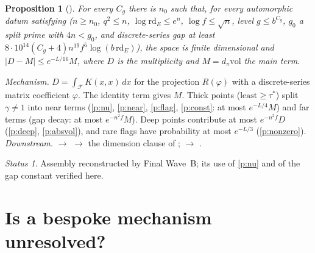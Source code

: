 \documentclass[11pt]{article}
\newcommand{\rd}{\mathrm{rd}}
\newcommand{\vol}{\mathrm{vol}}
\newtheorem{prop}{Proposition}
\theoremstyle{remark}
\newtheorem*{status}{Status}
\begin{document}
\begin{prop}[]\label{p:count}
For every $C_g$ there is $n_0$ such that, for every automorphic datum satisfying  ($n\ge n_0$, $q^2\le n$, $\log\rd_E\le e^n$, $\log f\le\sqrt n$, level $g\le b^{C_g}$, $g_0$ a split prime with $4n< g_0$, and discrete-series gap at least $8\cdot10^{14}(C_g+4)n^{19}f^5\log(b\,\rd_E)$), the space is finite dimensional and $\lvert D-M\rvert\le e^{-L/16}M$, where $D$ is the multiplicity and $M=d_\pi\vol$ the main term.
\end{prop}
\emph{Mechanism.} $D=\int_{\mathcal F}K(x,x)\,dx$ for the projection $R(\varphi)$ with a discrete-series matrix coefficient $\varphi$. The identity term gives $M$. Thick points ($\mathrm{least}\ge\tau^*$) split $\gamma\ne1$ into near terms (\ref{p:nu}, \ref{p:near}, \ref{p:flag}, \ref{p:const}: at most $e^{-L/4}M$) and far terms (gap decay: at most $e^{-n^2f}M$). Deep points contribute at most $e^{-n^2f}D$ (\ref{p:deep}, \ref{p:absvol}), and rare flags have probability at most $e^{-L/3}$ (\ref{p:nonzero}).
\emph{Downstream.}  $\to$  $\to$ the dimension clause of ;  $\to$ .
\begin{status}Assembly reconstructed by Final Wave~B; its use of \ref{p:nu} and of the gap constant verified here.\end{status}

\section{Is a bespoke mechanism unresolved?}
\end{document}
